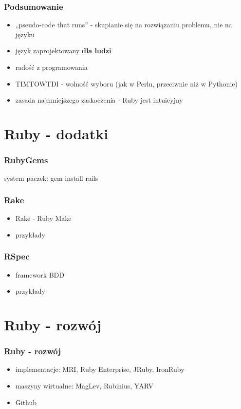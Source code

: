 \documentclass[12t]{beamer}
\begin{document}
\begin{frame}
  \frametitle{Podsumowanie}
  \begin{itemize}
  \item „pseudo-code that runs” - skupianie się na rozwiązaniu
    problemu, nie na języku
  \item język zaprojektowany \textbf{dla ludzi}
  \item radość z programowania
  \item TIMTOWTDI - wolność wyboru (jak w Perlu, przeciwnie niż w
    Pythonie)
  \item zasada najmniejszego zaskoczenia - Ruby jest intuicyjny
  \end{itemize}
\end{frame}

\section{Ruby - dodatki}
\begin{frame}
  \frametitle{RubyGems}
  system paczek: gem install rails
\end{frame}

\begin{frame}
  \frametitle{Rake}
  \begin{itemize}
  \item Rake - Ruby Make
  \item przykłady
  \end{itemize}
\end{frame}

\begin{frame}
  \frametitle{RSpec}
  \begin{itemize}
  \item framework BDD
  \item przykłady
  \end{itemize}
\end{frame}

\section{Ruby - rozwój}
\begin{frame}
  \frametitle{Ruby - rozwój}
  \begin{itemize}
  \item implementacje: MRI, Ruby Enterprise, JRuby, IronRuby
  \item maszyny wirtualne: MagLev, Rubinius, YARV
  \item Github
  \end{itemize}
\end{frame}
\end{document}
